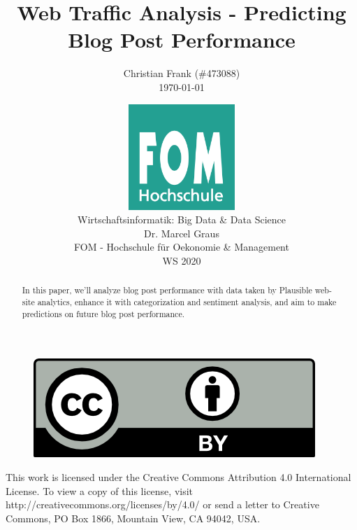 \documentclass[12pt,a4paper,listof=totoc,bibliography=totoc]{scrartcl}
\newcommand\svthema{Web Traffic Analysis - Predicting Blog Post Performance}
\newcommand\svperson{Christian Frank (\#473088)}
\newcommand\svdatum{\today}
\newcommand\lvname{Wirtschaftsinformatik: Big Data \& Data Science}
\newcommand\lvtyp{WS 2020}
\newcommand\lvinst{FOM - Hochschule für Oekonomie \& Management}
\newcommand\lvbetr{Dr. Marcel Graus}
\begin{document}
\title{ \huge\textbf{\svthema} }
\author{ {\svperson} \\ \svdatum }
\date{ \normalsize \centering \includegraphics[width=0.3\textwidth]{FOM}\\ {\lvname} \\ {\lvbetr} \\ {\lvinst} \\ {\lvtyp} }

\pagestyle{fancy}
\fancyhf{}
\fancyhf[ch]{\thepage}
\renewcommand\headrulewidth{0pt}

\maketitle
\thispagestyle{empty} %

\begin{abstract}
In this paper, we'll analyze blog post performance with data taken by Plausible web-site analytics, enhance it with categorization and sentiment analysis, and aim to make predictions on future blog post performance.

\end{abstract}

\vfill
\begin{figure}[h]
    \centering
    \includegraphics[]{CC-BY}
\end{figure}

This work is licensed under the Creative Commons Attribution 4.0 International License. To view a copy of this license, visit http://creativecommons.org/licenses/by/4.0/ or send a letter to Creative Commons, PO Box 1866, Mountain View, CA 94042, USA.
\end{document}

